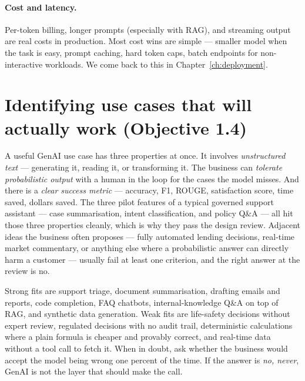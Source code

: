 \paragraph{Cost and latency.} Per-token billing, longer prompts (especially with RAG), and streaming output are real costs in production. Most cost wins are simple --- smaller model when the task is easy, prompt caching, hard token caps, batch endpoints for non-interactive workloads. We come back to this in Chapter~\ref{ch:deployment}.

\section{Identifying use cases that will actually work (Objective 1.4)}

A useful GenAI use case has three properties at once. It involves \emph{unstructured text} --- generating it, reading it, or transforming it. The business can \emph{tolerate probabilistic output} with a human in the loop for the cases the model misses. And there is a \emph{clear success metric} --- accuracy, F1, ROUGE, satisfaction score, time saved, dollars saved. The three pilot features of a typical governed support assistant --- case summarisation, intent classification, and policy Q\&A --- all hit those three properties cleanly, which is why they pass the design review. Adjacent ideas the business often proposes --- fully automated lending decisions, real-time market commentary, or anything else where a probabilistic answer can directly harm a customer --- usually fail at least one criterion, and the right answer at the review is no.

Strong fits are support triage, document summarisation, drafting emails and reports, code completion, FAQ chatbots, internal-knowledge Q\&A on top of RAG, and synthetic data generation. Weak fits are life-safety decisions without expert review, regulated decisions with no audit trail, deterministic calculations where a plain formula is cheaper and provably correct, and real-time data without a tool call to fetch it. When in doubt, ask whether the business would accept the model being wrong one percent of the time. If the answer is \emph{no, never}, GenAI is not the layer that should make the call.


